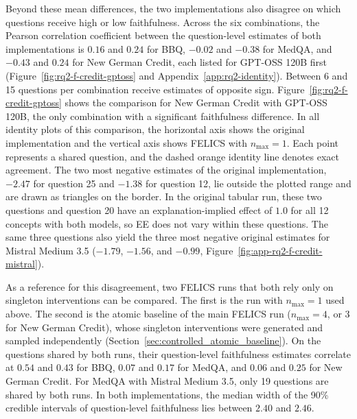 Beyond these mean differences, the two implementations also disagree on which questions receive high or low faithfulness. Across the six combinations, the Pearson correlation coefficient between the question-level estimates of both implementations is $0.16$ and $0.24$ for BBQ, $-0.02$ and $-0.38$ for MedQA, and $-0.43$ and $0.24$ for New German Credit, each listed for GPT-OSS 120B first (Figure~\ref{fig:rq2-f-credit-gptoss} and Appendix~\ref{app:rq2-identity}). Between 6 and 15 questions per combination receive estimates of opposite sign. Figure~\ref{fig:rq2-f-credit-gptoss} shows the comparison for New German Credit with GPT-OSS 120B, the only combination with a significant faithfulness difference. In all identity plots of this comparison, the horizontal axis shows the original implementation and the vertical axis shows FELICS with $n_{\max}=1$. Each point represents a shared question, and the dashed orange identity line denotes exact agreement. The two most negative estimates of the original implementation, $-2.47$ for question 25 and $-1.38$ for question 12, lie outside the plotted range and are drawn as triangles on the border. In the original tabular run, these two questions and question 20 have an explanation-implied effect of $1.0$ for all 12 concepts with both models, so EE does not vary within these questions. The same three questions also yield the three most negative original estimates for Mistral Medium 3.5 ($-1.79$, $-1.56$, and $-0.99$, Figure~\ref{fig:app-rq2-f-credit-mistral}).

As a reference for this disagreement, two FELICS runs that both rely only on singleton interventions can be compared. The first is the run with $n_{\max}=1$ used above. The second is the atomic baseline of the main FELICS run ($n_{\max}=4$, or $3$ for New German Credit), whose singleton interventions were generated and sampled independently (Section~\ref{sec:controlled_atomic_baseline}). On the questions shared by both runs, their question-level faithfulness estimates correlate at $0.54$ and $0.43$ for BBQ, $0.07$ and $0.17$ for MedQA, and $0.06$ and $0.25$ for New German Credit. For MedQA with Mistral Medium 3.5, only 19 questions are shared by both runs. In both implementations, the median width of the 90\% credible intervals of question-level faithfulness lies between $2.40$ and $2.46$.

